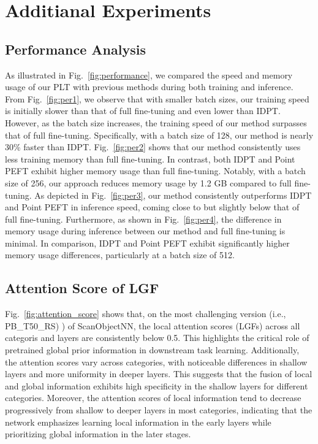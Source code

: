 \section{Additianal Experiments}

\subsection{Performance Analysis}
As illustrated in Fig.~\ref{fig:performance}, we compared the speed and memory usage of our PLT with previous methods during both training and inference. From Fig.~\ref{fig:per1}, we observe that with smaller batch sizes, our training speed is initially slower than that of full fine-tuning and even lower than IDPT. However, as the batch size increases, the training speed of our method surpasses that of full fine-tuning. Specifically, with a batch size of 128, our method is nearly 30\% faster than IDPT. Fig.~\ref{fig:per2} shows that our method consistently uses less training memory than full fine-tuning. In contrast, both IDPT and Point PEFT exhibit higher memory usage than full fine-tuning. Notably, with a batch size of 256, our approach reduces memory usage by 1.2 GB compared to full fine-tuning. As depicted in Fig.~\ref{fig:per3}, our method consistently outperforms IDPT and Point PEFT in inference speed, coming close to but slightly below that of full fine-tuning. Furthermore, as shown in Fig.~\ref{fig:per4}, the difference in memory usage during inference between our method and full fine-tuning is minimal. In comparison, IDPT and Point PEFT exhibit significantly higher memory usage differences, particularly at a batch size of 512.

\subsection{Attention Score of LGF}
Fig.~\ref{fig:attention_score} shows that, on the most challenging version (i.e., PB\_T50\_RS) ) of ScanObjectNN, the local attention scores (LGFs) across all categoris and layers are consistently below 0.5. This highlights the critical role of pretrained global prior information in downstream task learning. Additionally, the attention scores vary across categories, with noticeable differences in shallow layers and more uniformity in deeper layers. This suggests that the fusion of local and global information exhibits high specificity in the shallow layers for different categories. Moreover, the attention scores of local information tend to decrease progressively from shallow to deeper layers in most categories, indicating that the network emphasizes learning local information in the early layers while prioritizing global information in the later stages.

